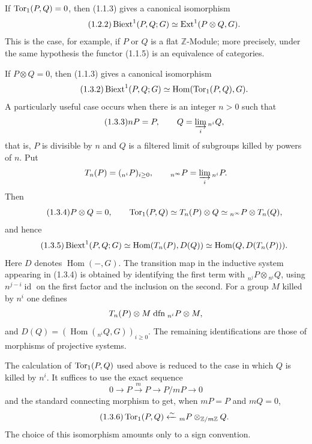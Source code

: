 \documentclass[11pt]{article}
\providecommand{\liminj}{\varinjlim}
\providecommand{\Hom}{\operatorname{Hom}}
\providecommand{\Ext}{\operatorname{Ext}}
\providecommand{\id}{\operatorname{id}}
\begin{document}
If \(\operatorname{Tor}_1(P,Q)=0\), then (1.1.3) gives a canonical isomorphism
\begin{equation}\tag{1.2.2}
        \Biext^1(P,Q;G)\simeq \Ext^1(P\otimes Q,G).
\end{equation}
This is the case, for example, if \(P\) or \(Q\) is a flat \(\mathbb Z\)-Module; more precisely, under the same hypothesis the functor (1.1.5) is an equivalence of categories.

If \(P\otimes Q=0\), then (1.1.3) gives a canonical isomorphism
\begin{equation}\tag{1.3.2}
        \Biext^1(P,Q;G)\simeq \Hom(\Torop_1(P,Q),G).
\end{equation}
A particularly useful case occurs when there is an integer \(n>0\) such that
\begin{equation}\tag{1.3.3}
        nP=P,
        \qquad
        Q=\liminj_i {}_{n^i}Q,
\end{equation}
that is, \(P\) is divisible by \(n\) and \(Q\) is a filtered limit of subgroups killed by powers of \(n\).  Put
\[
        T_n(P)=({}_{n^i}P)_{i\ge0},
        \qquad
        {}_{n^\infty}P=\liminj_i {}_{n^i}P.
\]
Then
\begin{equation}\tag{1.3.4}
        P\otimes Q=0,
        \qquad
        \operatorname{Tor}_1(P,Q)\simeq T_n(P)\otimes Q
        \simeq {}_{n^\infty}P\otimes T_n(Q),
\end{equation}
and hence
\begin{equation}\tag{1.3.5}
        \Biext^1(P,Q;G)
        \simeq \Hom(T_n(P),D(Q))
        \simeq \Hom(Q,D(T_n(P))).
\end{equation}
Here \(D\) denotes \(\Hom(-,G)\).  The transition map in the inductive system appearing in (1.3.4) is obtained by identifying the first term with \({}_{n^j}P\otimes{}_{n^i}Q\), using \(n^{j-i}\id\) on the first factor and the inclusion on the second.  For a group \(M\) killed by \(n^i\) one defines
\[
        T_n(P)\otimes M\mathrel{\mathrm{dfn}} {}_{n^i}P\otimes M,
\]
and \(D(Q)=(\Hom({}_{n^i}Q,G))_{i\ge0}\).  The remaining identifications are those of morphisms of projective systems.

The calculation of \(\operatorname{Tor}_1(P,Q)\) used above is reduced to the case in which \(Q\) is killed by \(n^i\).  It suffices to use the exact sequence
\[
        0\to P\xrightarrow{m}P\to P/mP\to0
\]
and the standard connecting morphism to get, when \(mP=P\) and \(mQ=0\),
\begin{equation}\tag{1.3.6}
        \operatorname{Tor}_1(P,Q)\xleftarrow{\sim}{}_mP\otimes_{\mathbb Z/m\mathbb Z} Q.
\end{equation}
The choice of this isomorphism amounts only to a sign convention.
\end{document}
